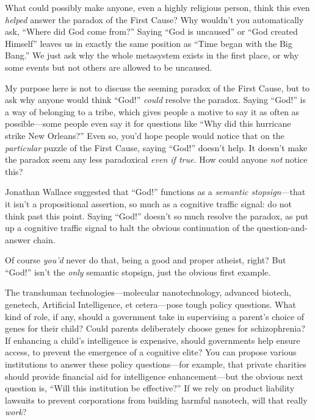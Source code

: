 {
 What could possibly make anyone, even a highly religious person,
think this even \textit{helped} answer the paradox of the First Cause?
Why wouldn't you automatically ask,
``Where did God come from?'' Saying
``God is uncaused'' or
``God created Himself'' leaves us in
exactly the same position as ``Time began with the Big
Bang.'' We just ask why the whole metasystem exists
in the first place, or why some events but not others are allowed to be
uncaused.}

{
 My purpose here is not to discuss the seeming paradox of the First
Cause, but to ask why anyone would think
``God!'' \textit{could} resolve the
paradox. Saying ``God!'' is a way of
belonging to a tribe, which gives people a motive to say it as often as
possible---some people even say it for questions like
``Why did this hurricane strike New
Orleans?'' Even so, you'd hope people
would notice that on the \textit{particular} puzzle of the First Cause,
saying ``God!''
doesn't help. It doesn't make the
paradox seem any less paradoxical \textit{even if true.} How could
anyone \textit{not} notice this?}

{
 Jonathan Wallace suggested that
``God!'' functions as a
\textit{semantic stopsign}{}---that it isn't a
propositional assertion, so much as a cognitive traffic signal: do not
think past this point. Saying
``God!'' doesn't so
much resolve the paradox, as put up a cognitive traffic signal to halt
the obvious continuation of the question-and-answer chain.}

{
 Of course \textit{you'd} never do that, being a
good and proper atheist, right? But
``God!'' isn't the
\textit{only} semantic stopsign, just the obvious first example.}

{
 The transhuman technologies---molecular nanotechnology, advanced
biotech, genetech, Artificial Intelligence, et cetera---pose tough
policy questions. What kind of role, if any, should a government take
in supervising a parent's choice of genes for their
child? Could parents deliberately choose genes for schizophrenia? If
enhancing a child's intelligence is expensive, should
governments help ensure access, to prevent the emergence of a cognitive
elite? You can propose various institutions to answer these policy
questions---for example, that private charities should provide
financial aid for intelligence enhancement---but the obvious next
question is, ``Will this institution be
effective?'' If we rely on product liability lawsuits
to prevent corporations from building harmful nanotech, will that
really \textit{work}?}

